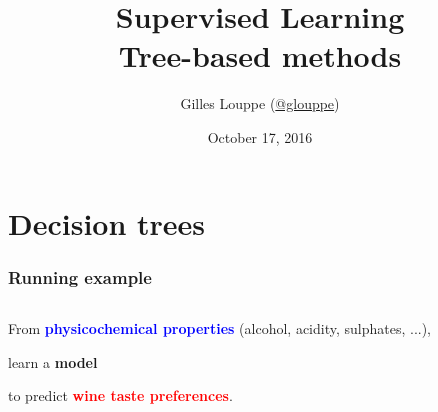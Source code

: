 \documentclass{beamer}
\title{{\bf Supervised Learning}\\
Tree-based methods}
\author{
Gilles Louppe (\href{https://twitter.com/glouppe}{@glouppe})
}
\date{October 17, 2016}
\newcommand{\X}[1]{\textcolor{blue}{#1}}
\newcommand{\y}[1]{\textcolor{red}{#1}}
\newcommand{\model}[1]{\textcolor{mygreen}{#1}}
\begin{document}
\begin{frame}[plain]
\titlepage
\end{frame}





\section{Decision trees}

\begin{frame}
    \frametitle{Running example}

    \begin{columns}
    \begin{column}{0.5\textwidth}

    \begin{center}
    From {\bf \X{physicochemical properties}} (alcohol, acidity, sulphates, ...),

    \vspace{1cm}
    learn a {\bf \model{model}}
    \vspace{1cm}

    to predict {\bf \y{wine taste preferences}}.

    \end{center}


\end{column}
\end{columns}
\end{frame}
\end{document}
